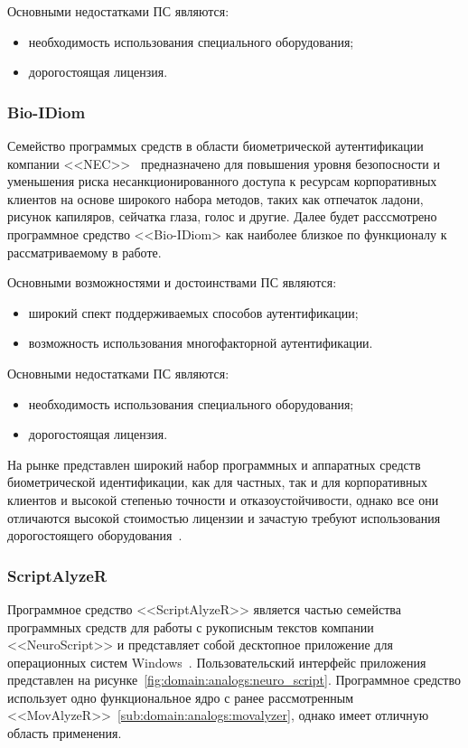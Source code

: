 Основными недостатками ПС являются:
\begin{itemize}
  \item необходимость использования специального оборудования;
  \item дорогостоящая лицензия.
\end{itemize}

\subsubsection{Bio-IDiom}
\label{sub:domain:analogs:nec}
Семейство программых средств в области биометрической аутентификации компании <<NEC>>~\cite{analogs_nec} предназначено для повышения уровня безопосности и уменьшения риска несанкционированного доступа к ресурсам корпоративных клиентов на основе широкого набора методов, таких как отпечаток ладони, рисунок капиляров, сейчатка глаза, голос и другие. Далее будет расссмотрено программное средство <<Bio-IDiom> как наиболее близкое по функционалу к рассматриваемому в работе.

Основными возможностями и достоинствами ПС являются:
\begin{itemize}
  \item широкий спект поддерживаемых способов аутентификации;
  \item возможность использования многофакторной аутентификации.
\end{itemize}

Основными недостатками ПС являются:
\begin{itemize}
  \item необходимость использования специального оборудования;
  \item дорогостоящая лицензия.
\end{itemize}

На рынке представлен широкий набор программных и аппаратных средств биометрической идентификации, как для частных, так и для корпоративных клиентов и высокой степенью точности и отказоустойчивости, однако все они отличаются высокой стоимостью лицензии и зачастую требуют использования дорогостоящего оборудования~\cite{wacom_lcd}.

\subsubsection{ScriptAlyzeR}
\label{sub:domain:analogs:neuro_script}
Программное средство <<ScriptAlyzeR>> является частью семейства программных средств для работы с рукописным текстов компании <<NeuroScript>> и представляет собой десктопное приложение для операционных систем Windows~\cite{analogs_scriptAlyzer}. Пользовательский интерфейс приложения представлен на рисунке~\ref{fig:domain:analogs:neuro_script}. Программное средство использует одно функциональное ядро с ранее рассмотренным <<MovAlyzeR>>~\ref{sub:domain:analogs:movalyzer}, однако имеет отличную область применения.


